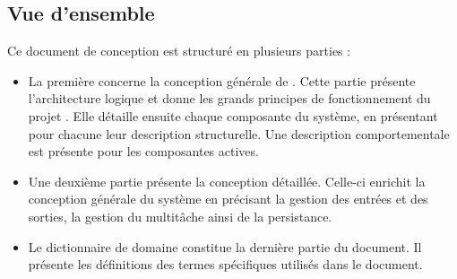 \newpage
\subsection{Vue d'ensemble} %

Ce document de conception est structuré en plusieurs parties :
\begin{itemize}
    \item La première concerne la conception générale de \projectName. Cette partie présente l'architecture logique et donne les grands principes de fonctionnement
    du projet \projectName. Elle détaille ensuite chaque composante du système, en présentant
    pour chacune leur description structurelle. Une description comportementale est présente
    pour les composantes actives.
    \item Une deuxième partie présente la conception détaillée. Celle-ci enrichit la conception générale 
    du système en précisant la gestion des entrées et des sorties, la gestion du multitâche ainsi de la persistance.
    \item Le dictionnaire de domaine constitue la dernière partie du document. Il présente les définitions des termes 
    spécifiques utilisés dans le document.
\end{itemize}